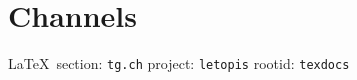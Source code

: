  
 

\section{Channels}

\vspace{0.5cm}
 {\ifDEBUG\small\LaTeX~section: \verb|tg.ch| project: \verb|letopis| rootid: \verb|texdocs|	\fi}
\vspace{0.5cm}

  
